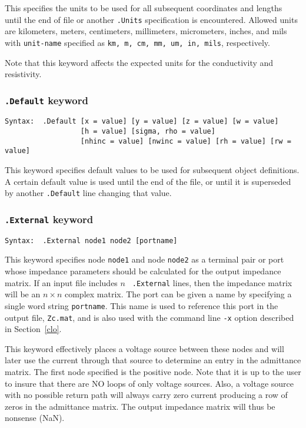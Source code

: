 This specifies the units to be used for all subsequent coordinates and lengths
until the end of file or another {\tt .Units} specification is
encountered.  Allowed units are kilometers, meters, centimeters, millimeters,
micrometers, inches, and mils with {\tt unit-name} specified as 
{\tt km, m, cm, mm, um, in,
mils}, respectively.  

Note that this keyword affects the expected units for the conductivity
and resistivity.

\subsubsection{{\tt .Default} keyword}

\begin{verbatim}
Syntax:  .Default [x = value] [y = value] [z = value] [w = value] 
                  [h = value] [sigma, rho = value]
                  [nhinc = value] [nwinc = value] [rh = value] [rw = value]
\end{verbatim}

This keyword specifies default values to be used for subsequent object
definitions.  A certain default value is used until the end of the file, or
until it is superseded by another {\tt .Default} line changing that value.

\subsubsection{{\tt .External} keyword}

\begin{verbatim}
Syntax:  .External node1 node2 [portname]
\end{verbatim}

This keyword specifies node {\tt node1} and node {\tt node2} as a
terminal pair or port whose impedance parameters should be calculated 
for the output impedance matrix.  If an input file includes $ n $ {\tt
.External} lines, then the impedance matrix will be an $ n \times n $
complex matrix.  The port can be given a name by specifying a single
word string {\tt portname}.  This name is used to reference this port
in the output file, {\tt Zc.mat}, and is also used with 
the command line {\tt -x} option described in Section~\ref{clo}.

This keyword effectively places a voltage source between these nodes
and will later use the current through that source to determine an
entry in the admittance matrix.  The first node specified is the
positive node.  Note that it is up to the user to insure that there
are NO loops of only voltage sources.  Also, a voltage source with no
possible return path will always carry zero current 
producing a row of zeros in the admittance matrix.  The output
impedance matrix will thus be nonsense (NaN).

